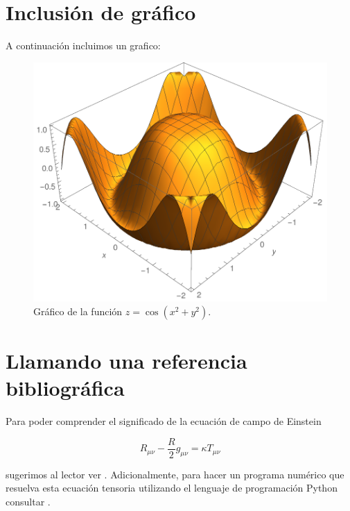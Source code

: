 \documentclass{article}
\begin{document}
	
	
	
	\section{Inclusión de gráfico}
	A continuación incluimos un grafico:
	
	\begin{figure}[h]
		\centering
		\includegraphics[scale=0.5]{imagen.pdf}
		\caption{Gráfico de la función $z=\cos ( x^2 + y^2 )$.}
		\label{etiquetadelgrafico}
	\end{figure}
	
	
	\section{Llamando una referencia bibliográfica}
	Para poder comprender el significado de la ecuación de campo de Einstein 
	
	\begin{equation*}
	R_{\mu \nu} - \dfrac{R}{2} g_{\mu \nu } = \kappa T_{\mu \nu}
	\end{equation*}
	
	sugerimos al lector ver \cite{einstein}. Adicionalmente, para hacer un programa 
	numérico que resuelva esta ecuación tensoria utilizando el lenguaje de
	programación Python consultar \cite{python}.
	
	
	\begin{thebibliography}{99}
		
		
		
		
	\end{thebibliography}
	
	
\end{document}
